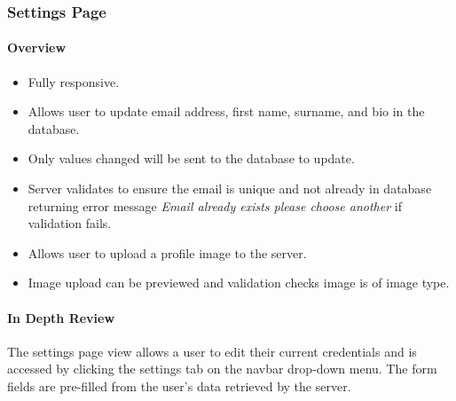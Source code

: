 \subsubsection{Settings Page}
\paragraph{Overview\newline}
\begin{itemize}
    \item Fully responsive.
    \item Allows user to update email address, first name, surname, and bio in the database.
    \item Only values changed will be sent to the database to update.
    \item Server validates to ensure the email is unique and not already in database returning error message {\color{red}\textit{Email already exists please choose another}} if validation fails.
    \item Allows user to upload a profile image to the server.
    \item Image upload can be previewed and validation checks image is of image type.
\end{itemize}

\paragraph{In Depth Review\newline}
The settings page view allows a user to edit their current credentials and is accessed by clicking the settings tab on the navbar drop-down menu. The form fields are pre-filled from the user's data retrieved by the server.

